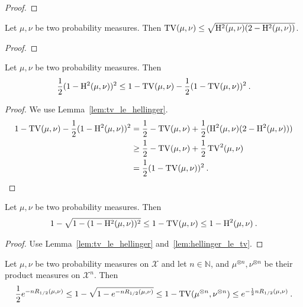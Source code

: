 \begin{proof}
\end{proof}

\begin{lemma}
  \label{lem:tv_le_hellinger}
  Let $\mu, \nu$ be two probability measures. Then $\operatorname{TV}(\mu, \nu) \le \sqrt{\operatorname{H^2}(\mu, \nu)(2 - \operatorname{H^2}(\mu, \nu))}$.
\end{lemma}

\begin{proof}
\end{proof}

\begin{corollary}
  \label{cor:one_sub_hellinger_squared_le_one_sub_tv}
  Let $\mu, \nu$ be two probability measures. Then
  \begin{align*}
  \frac{1}{2}(1 - \operatorname{H^2}(\mu, \nu))^2 \le 1 - \operatorname{TV}(\mu, \nu) - \frac{1}{2}(1 - \operatorname{TV}(\mu, \nu))^2
  \: .
  \end{align*}
\end{corollary}

\begin{proof}
We use Lemma~\ref{lem:tv_le_hellinger}.
\begin{align*}
1 - \operatorname{TV}(\mu, \nu) - \frac{1}{2}(1 - \operatorname{H^2}(\mu, \nu))^2
&= \frac{1}{2} - \operatorname{TV}(\mu, \nu) + \frac{1}{2}(\operatorname{H^2}(\mu, \nu)(2 - \operatorname{H^2}(\mu, \nu)))
\\
&\ge \frac{1}{2} - \operatorname{TV}(\mu, \nu) + \frac{1}{2}\operatorname{TV}^2(\mu, \nu)
\\
&= \frac{1}{2}(1 - \operatorname{TV}(\mu, \nu))^2
\: .
\end{align*}
\end{proof}

\begin{corollary}
  \label{cor:one_sub_hellinger_le_one_sub_tv}
  Let $\mu, \nu$ be two probability measures. Then
  \begin{align*}
  1 - \sqrt{1 - (1 - \operatorname{H^2}(\mu, \nu))^2} \le 1 - \operatorname{TV}(\mu, \nu) \le 1 - \operatorname{H^2}(\mu, \nu)
  \: .
  \end{align*}
\end{corollary}

\begin{proof}
Use Lemma~\ref{lem:tv_le_hellinger} and~\ref{lem:hellinger_le_tv}.
\end{proof}

\begin{corollary}
  \label{cor:one_sub_tv_bound_renyi}
  Let $\mu, \nu$ be two probability measures on $\mathcal X$ and let $n \in \mathbb{N}$, and $\mu^{\otimes n}, \nu^{\otimes n}$ be their product measures on $\mathcal X^n$. Then
  \begin{align*}
  \frac{1}{2}e^{-n R_{1/2}(\mu, \nu)} \le 1 - \sqrt{1 - e^{-n R_{1/2}(\mu, \nu)}} \le 1 - \operatorname{TV}(\mu^{\otimes n}, \nu^{\otimes n}) \le e^{-\frac{1}{2} n R_{1/2}(\mu, \nu)}
  \: .
  \end{align*}
\end{corollary}

